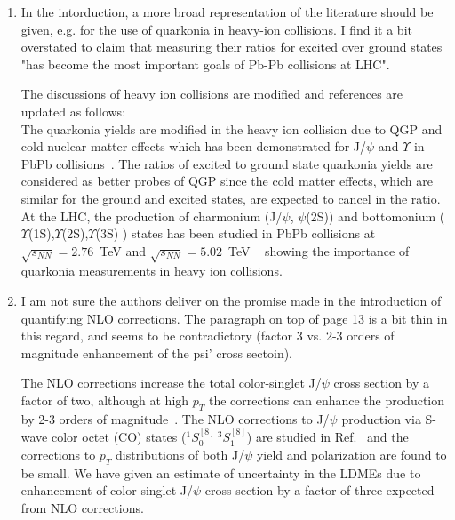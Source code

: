 \documentclass[aps,prc,preprint,superscriptaddress,showpacs,showkeys,amsmath]{revtex4-1}
\begin{document}
\begin{enumerate}

\item In the intorduction, a more broad representation of the literature should
be given, e.g. for the use of quarkonia in heavy-ion collisions. I find it 
a bit overstated to claim that measuring their ratios for excited over ground 
states "has become the most important goals of Pb-Pb collisions at LHC".

{\color{blue}
    
  The discussions of heavy ion collisions are modified and references are updated as follows:\\
    
  The quarkonia yields are modified in the heavy ion collision due to QGP
  and cold nuclear matter effects which has been demonstrated for J/$\psi$ and $\Upsilon$ 
  in PbPb collisions~\cite{Strickland:2011mw,Kumar:2014kfa,Zhou:2016wbo}. The ratios of excited to ground state quarkonia 
  yields are considered as better probes of QGP since the cold matter effects, 
  which are similar for the ground and excited states, are expected to cancel in the 
  ratio. At the LHC, the production of charmonium (J/$\psi$, $\psi$(2S)) 
  and bottomonium ($\Upsilon$(1S),$\Upsilon$(2S),$\Upsilon$(3S) ) states has been studied in 
  PbPb collisions at $\sqrt{s_{NN}} = 2.76$~TeV and $\sqrt{s_{NN}} = 5.02$~TeV
  ~\cite{Chatrchyan:2012lxa,Khachatryan:2014bva,Khachatryan:2016ypw,Sirunyan:2016znt,Khachatryan:2016xxp,Abelev:2013ila}
  showing the importance of quarkonia measurements in heavy ion collisions.
}

\item I am not sure the authors deliver on the promise made in the introduction
of quantifying NLO corrections. The paragraph on top of page 13 is a bit thin 
in this regard, and seems to be contradictory (factor 3 vs. 2-3 orders of magnitude 
enhancement of the psi' cross sectoin).

{\color{blue}
  The NLO corrections increase the total color-singlet J/$\psi$ cross section by a 
  factor of two, although at high $p_T$ the corrections can enhance the production by
  2-3 orders of magnitude~\cite{Gong:2008sn}.
  The NLO corrections to J/$\psi$ production via S-wave 
  color octet (CO) states ($^1S_{0}^{[8]}\,^3S_{1}^{[8]}$) are studied in 
  Ref.~\cite{Gong:2008ft} and the corrections to $p_{T}$ distributions of both 
  J/$\psi$ yield and polarization are found to be small.
  We have given an estimate of uncertainty in the LDMEs due to enhancement of 
  color-singlet J/$\psi$ cross-section by a factor of three expected from NLO 
  corrections. 
 
}
\end{enumerate}
\end{document}
